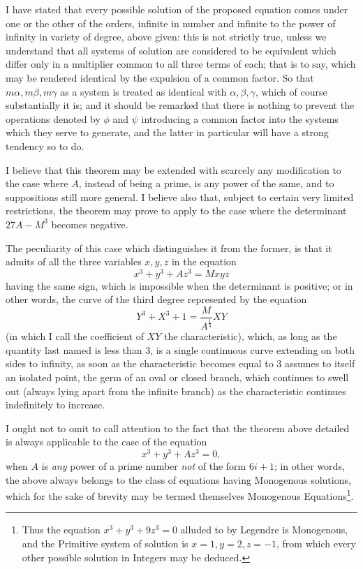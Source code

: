 \documentclass[11pt]{article}
\newcommand{\sourcepage}[1]{\marginpar{\scriptsize p.~#1}}
\begin{document}
\sourcepage{117}
I have stated that every possible solution of the proposed equation comes under one or the other of the orders, infinite in number and infinite to the power of infinity in variety of degree, above given: this is not strictly true, unless we understand that all systems of solution are considered to be equivalent which differ only in a multiplier common to all three terms of each; that is to say, which may be rendered identical by the expulsion of a common factor. So that $m\alpha,m\beta,m\gamma$ as a system is treated as identical with $\alpha,\beta,\gamma$, which of course substantially it is; and it should be remarked that there is nothing to prevent the operations denoted by $\phi$ and $\psi$ introducing a common factor into the systems which they serve to generate, and the latter in particular will have a strong tendency so to do.

I believe that this theorem may be extended with scarcely any modification to the case where $A$, instead of being a prime, is any power of the same, and to suppositions still more general. I believe also that, subject to certain very limited restrictions, the theorem may prove to apply to the case where the determinant $27A-M^3$ becomes negative.

The peculiarity of this case which distinguishes it from the former, is that it admits of all the three variables $x,y,z$ in the equation
\[
x^3+y^3+Az^3=Mxyz
\]
having the same sign, which is impossible when the determinant is positive; or in other words, the curve of the third degree represented by the equation
\[
Y^3+X^3+1=\frac{M}{A^{\frac{1}{3}}}XY
\]
(in which I call the coefficient of $XY$ the characteristic), which, as long as the quantity last named is less than 3, is a single continuous curve extending on both sides to infinity, as soon as the characteristic becomes equal to 3 assumes to itself an isolated point, the germ of an oval or closed branch, which continues to swell out (always lying apart from the infinite branch) as the characteristic continues indefinitely to increase.

I ought not to omit to call attention to the fact that the theorem above detailed is always applicable to the case of the equation
\[
x^3+y^3+Az^3=0,
\]
when $A$ is \emph{any} power of a prime number \emph{not} of the form $6i+1$; in other words, the above always belongs to the class of equations having Monogenous solutions, which for the sake of brevity may be termed themselves Monogenous Equations\footnote{Thus the equation $x^3+y^3+9z^3=0$ alluded to by Legendre is Monogenous, and the Primitive system of solution is $x=1,y=2,z=-1$, from which every other possible solution in Integers may be deduced.}.
\end{document}
